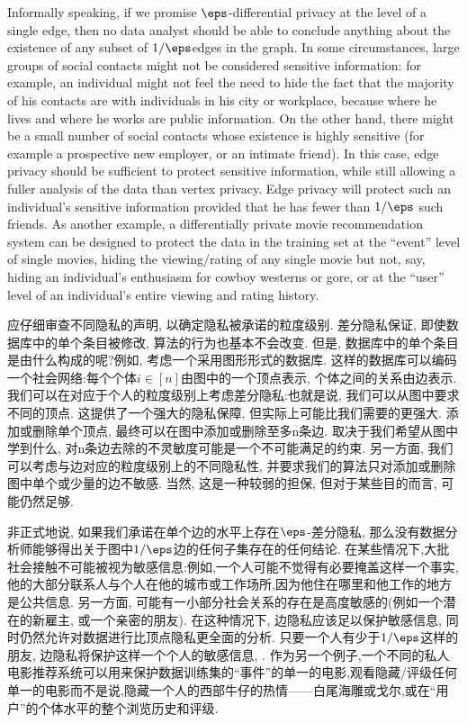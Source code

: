 Informally speaking, if we promise $\eps$-differential privacy at the level of a single edge, then no data analyst should be able to conclude anything about the existence of any subset of $1/\eps $edges in the graph. In some circumstances, large groups of social contacts might not be considered sensitive information: for example, an individual might not feel the need to hide the fact that the majority of his contacts are with individuals in his city or workplace, because where he lives and where he works are public information. On the other hand, there might be a small number of social contacts whose existence is highly sensitive (for example a prospective new employer, or an intimate friend). In this case, edge privacy should be sufficient to protect sensitive information, while still allowing a fuller analysis of the data than vertex privacy. Edge privacy will protect such an individual’s sensitive information provided that he has fewer than $1/\eps$ such friends. As another example, a differentially private movie recommendation system can be designed to protect the data in the training set at the “event” level of single movies, hiding the viewing/rating of any single movie but not, say, hiding an individual’s enthusiasm for cowboy westerns or gore, or at the “user” level of an individual’s entire viewing and rating history.

应仔细审查不同隐私的声明, 以确定隐私被承诺的粒度级别. 差分隐私保证, 即使数据库中的单个条目被修改, 算法的行为也基本不会改变. 但是, 数据库中的单个条目是由什么构成的呢?例如, 考虑一个采用图形形式的数据库. 这样的数据库可以编码一个社会网络:每个个体$i \in [n]$由图中的一个顶点表示, 个体之间的关系由边表示. 我们可以在对应于个人的粒度级别上考虑差分隐私:也就是说, 我们可以从图中要求不同的顶点. 这提供了一个强大的隐私保障, 但实际上可能比我们需要的更强大. 添加或删除单个顶点, 最终可以在图中添加或删除至多n条边. 取决于我们希望从图中学到什么, 对n条边去除的不灵敏度可能是一个不可能满足的约束. 
另一方面, 我们可以考虑与边对应的粒度级别上的不同隐私性, 并要求我们的算法只对添加或删除图中单个或少量的边不敏感. 当然, 这是一种较弱的担保, 但对于某些目的而言, 可能仍然足够. 

非正式地说, 如果我们承诺在单个边的水平上存在$\eps$-差分隐私, 那么没有数据分析师能够得出关于图中$1/\eps $边的任何子集存在的任何结论. 在某些情况下,大批社会接触不可能被视为敏感信息:例如,一个人可能不觉得有必要掩盖这样一个事实,他的大部分联系人与个人在他的城市或工作场所,因为他住在哪里和他工作的地方是公共信息. 另一方面, 可能有一小部分社会关系的存在是高度敏感的(例如一个潜在的新雇主, 或一个亲密的朋友). 
在这种情况下, 边隐私应该足以保护敏感信息, 同时仍然允许对数据进行比顶点隐私更全面的分析. 只要一个人有少于$1/\eps$这样的朋友, 边隐私将保护这样一个个人的敏感信息, . 作为另一个例子,一个不同的私人电影推荐系统可以用来保护数据训练集的“事件”的单一的电影,观看隐藏/评级任何单一的电影而不是说,隐藏一个人的西部牛仔的热情——白尾海雕或戈尔,或在“用户”的个体水平的整个浏览历史和评级. 


